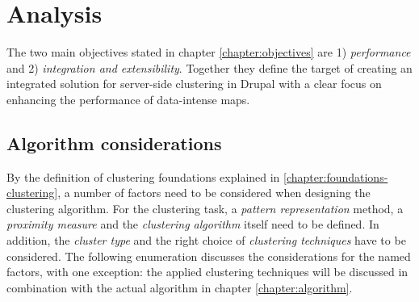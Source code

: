
%
%

\section{Analysis}
\label{chapter:analysis}

The two main objectives stated in chapter \ref{chapter:objectives} are 1) \textit{performance} and 2) \textit{integration and extensibility}. Together they define the target of creating an integrated solution for server-side clustering in Drupal with a clear focus on enhancing the performance of data-intense maps.

\subsection{Algorithm considerations}

By the definition of clustering foundations explained in \ref{chapter:foundations-clustering}, a number of factors need to be considered when designing the clustering algorithm. For the clustering task, a \textit{pattern representation} method, a \textit{proximity measure} and the \textit{clustering algorithm} itself need to be defined. In addition, the \textit{cluster type} and the right choice of \textit{clustering techniques} have to be considered. The following enumeration discusses the considerations for the named factors, with one exception: the applied clustering techniques will be discussed in combination with the actual algorithm in chapter \ref{chapter:algorithm}. 

